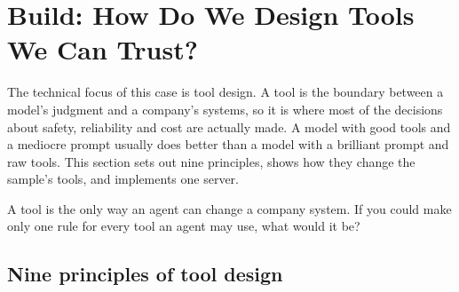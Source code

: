 
\section{Build: How Do We Design Tools We Can Trust?}
\label{sec:support-build}

The technical focus of this case is tool design. A tool is the boundary between a model's judgment and a company's systems, so it is where most of the decisions about safety, reliability and cost are actually made. A model with good tools and a mediocre prompt usually does better than a model with a brilliant prompt and raw tools. This section sets out nine principles, shows how they change the sample's tools, and implements one server.

\begin{thinkabout}
A tool is the only way an agent can change a company system. If you could make only one rule for every tool an agent may use, what would it be?
\end{thinkabout}

\subsection{Nine principles of tool design}

